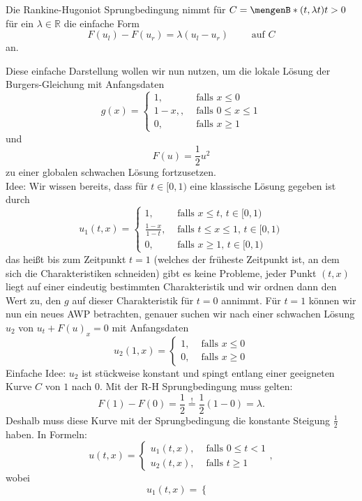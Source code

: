 \begin{bemerkung}
	Die Rankine-Hugoniot Sprungbedingung nimmt für $C = \set[(t,\lambda t)]{t >0}$ für ein $\lambda \in \mathbb{R}$ die einfache Form
	\[
		F(u_l)-F(u_r) = \lambda (u_l-u_r) \qquad \text{ auf }C
	\]
	an.
 
Diese einfache Darstellung wollen wir nun nutzen, um die lokale Lösung der Burgers-Gleichung mit Anfangsdaten
\[
	g(x) = \begin{cases}
		1, &\text{ falls }x \leq 0\\
		1-x, , &\text{ falls }0 \leq x \leq 1 \\
		0, &\text{ falls }x \geq 1
	\end{cases}
\]
und \[
	F(u) = \frac{1}{2} u^2
\]
zu einer globalen schwachen Lösung fortzusetzen. \\
Idee: Wir wissen bereits, dass für $t \in [0,1)$ eine klassische Lösung gegeben ist durch
\[
	u_1(t,x) = \begin{cases}
		1, &\text{ falls }x \leq t, \,t \in [0,1)\\
		\frac{1-x}{1-t} , &\text{ falls }t \leq x \leq 1, \, t \in [0,1) \\
		0, &\text{ falls }x \geq  1, \,t \in [0,1)
		\end{cases}
\]
das heißt bis zum Zeitpunkt $t=1$ (welches der früheste Zeitpunkt ist, an dem sich die Charakteristiken schneiden) gibt es keine Probleme, jeder Punkt $(t,x)$ liegt auf einer eindeutig bestimmten Charakteristik und wir ordnen dann den Wert zu, den $g$ auf dieser Charakteristik für $t=0$ annimmt. Für $t=1$ können wir nun ein neues AWP betrachten, genauer suchen wir nach einer schwachen Lösung $u_2$ von $u_t+F(u)_x = 0$ mit Anfangsdaten
\[
	u_2(1,x) = \begin{cases}
		1, &\text{ falls }x \leq 0\\
		0, &\text{ falls }x \geq 0
	\end{cases} 
\]
Einfache Idee: $u_2$ ist stückweise konstant und spingt entlang einer geeigneten Kurve $C$ von $1$ nach $0$. Mit der R-H Sprungbedingung muss gelten:
\[
	F(1)- F(0) = \frac{1}{2} \stackrel{!}{=} \frac{1}{2} ( 1 - 0) = \lambda.
\]
Deshalb muss diese Kurve mit der Sprungbedingung die konstante Steigung $\frac{1}{2}$ haben. In Formeln:
\[
	u(t,x) = \begin{cases}
		u_1(t,x), &\text{ falls }0 \leq t<1\\
		u_2(t,x), &\text{ falls }t \geq 1
	\end{cases},
\]
wobei
\[
	u_1(t,x) = \begin{cases}

\end{cases}\]
\end{bemerkung}
